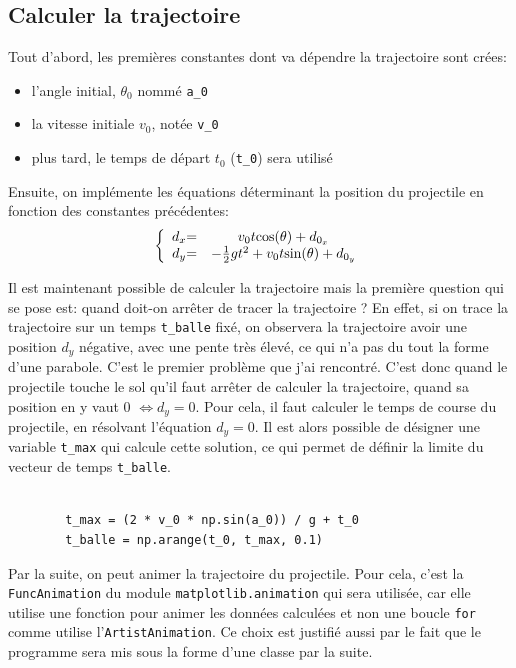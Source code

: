 \documentclass[a4paper, 11pt]{article}
\begin{document}
\subsection{Calculer la trajectoire}
Tout d'abord, les premières constantes dont va dépendre la trajectoire sont crées:
\begin{itemize}
	\item l'angle initial, $\theta_0$ nommé \verb|a_0|
	\item la vitesse initiale $v_0$, notée \verb|v_0|
	\item plus tard, le temps de départ $t_0$ (\verb|t_0|) sera utilisé
\end{itemize}
Ensuite, on implémente les équations déterminant la position du projectile en fonction des constantes précédentes:
\[ \left \{
\begin{array}{c @{= \quad} c}
	d_x & v_0 t \text{cos} (\theta) + d_{0_x}\\
	d_y &- \frac{1}{2} g t^2 + v_0 t \text{sin}(\theta) + d_{0_y}
\end{array}
\right. \]

Il est maintenant possible de calculer la trajectoire mais la première question qui se pose est: quand doit-on arrêter de tracer la trajectoire ? En effet, si on trace la trajectoire sur un temps \verb|t_balle| fixé, on observera la trajectoire avoir une position $d_y$ négative, avec une pente très élevé, ce qui n'a pas du tout la forme d'une parabole. C'est le premier problème que j'ai rencontré. C'est donc quand le projectile touche le sol qu'il faut arrêter de calculer la trajectoire, quand sa position en y vaut 0 $\Leftrightarrow d_y = 0$. Pour cela, il faut calculer le temps de course du projectile, en résolvant l'équation $d_y = 0$. Il est alors possible de désigner une variable \verb|t_max| qui calcule cette solution, ce qui permet de définir la limite du vecteur de temps \verb|t_balle|.
	\begin{verbatim}
	
		t_max = (2 * v_0 * np.sin(a_0)) / g + t_0   
		t_balle = np.arange(t_0, t_max, 0.1)
	\end{verbatim}

Par la suite, on peut animer la trajectoire du projectile. Pour cela, c'est la \verb|FuncAnimation| du module \verb|matplotlib.animation| qui sera utilisée, car elle utilise une fonction pour animer les données calculées et non une boucle \verb|for| comme utilise l'\verb|ArtistAnimation|. Ce choix est justifié aussi par le fait que le programme sera mis sous la forme d'une classe par la suite. 
\end{document}
